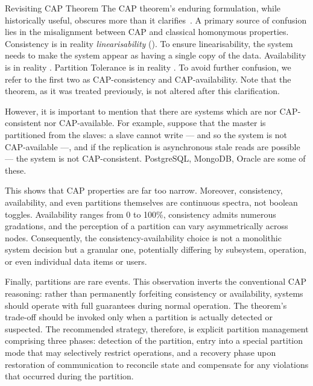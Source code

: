 \begin{note}{Revisiting CAP Theorem}
    The CAP theorem's enduring  formulation, while historically useful, obscures more than it clarifies~\cite{brewer2012caprevisited}. 
    A primary source of confusion lies in the misalignment between CAP and classical homonymous properties.
    Consistency is in reality \emph{linearisability} (). To ensure linearisability, the system needs to make the system appear as having a single copy of the data.
    Availability is in reality .
    Partition Tolerance is in reality .
    To avoid further confusion, we refer to the first two as CAP-consistency and CAP-availability.
    Note that the theorem, as it was treated previously, is not altered after this clarification. 

    However, it is important to mention that there are systems which are nor CAP-consistent nor CAP-available. For example, suppose that the master is partitioned from the slaves: a slave cannot write --- and so the system is not CAP-available ---, and if the replication is asynchronous stale reads are possible --- the system is not CAP-consistent.
    PostgreSQL, MongoDB, Oracle are some of these.

    This shows that CAP properties are far too narrow.
    Moreover, consistency, availability, and even partitions themselves are continuous spectra, not boolean toggles. Availability ranges from 0 to 100\%, consistency admits numerous gradations, and the perception of a partition can vary asymmetrically across nodes. 
    Consequently, the consistency-availability choice is not a monolithic system decision but a granular one, potentially differing by subsystem, operation, or even individual data items or users.
    
    Finally, partitions are rare events. 
    This observation inverts the conventional CAP reasoning: rather than permanently forfeiting consistency or availability, systems should operate with full guarantees during normal operation. 
    The theorem's trade-off should be invoked only when a partition is actually detected or suspected. 
    The recommended strategy, therefore, is explicit partition management comprising three phases: detection of the partition, entry into a special partition mode that may selectively restrict operations, and a recovery phase upon restoration of communication to reconcile state and compensate for any violations that occurred during the partition.
\end{note}

